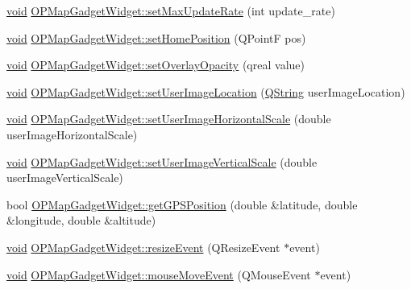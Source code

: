 \begin{DoxyCompactItemize}
\item 
\hyperlink{group___u_a_v_objects_plugin_ga444cf2ff3f0ecbe028adce838d373f5c}{void} \hyperlink{group___o_p_map_plugin_ga865f22d42c30a2446539f03df486e64e}{\-O\-P\-Map\-Gadget\-Widget\-::set\-Max\-Update\-Rate} (int update\-\_\-rate)
\item 
\hyperlink{group___u_a_v_objects_plugin_ga444cf2ff3f0ecbe028adce838d373f5c}{void} \hyperlink{group___o_p_map_plugin_ga44a752ab2b6f6b6212e39316b4050683}{\-O\-P\-Map\-Gadget\-Widget\-::set\-Home\-Position} (\-Q\-Point\-F pos)
\item 
\hyperlink{group___u_a_v_objects_plugin_ga444cf2ff3f0ecbe028adce838d373f5c}{void} \hyperlink{group___o_p_map_plugin_ga7d642e3ea7bf1e5cd0cc8be6dafc7ba8}{\-O\-P\-Map\-Gadget\-Widget\-::set\-Overlay\-Opacity} (qreal value)
\item 
\hyperlink{group___u_a_v_objects_plugin_ga444cf2ff3f0ecbe028adce838d373f5c}{void} \hyperlink{group___o_p_map_plugin_ga7afda7ed24be3606e25a6005fcc881da}{\-O\-P\-Map\-Gadget\-Widget\-::set\-User\-Image\-Location} (\hyperlink{group___u_a_v_objects_plugin_gab9d252f49c333c94a72f97ce3105a32d}{\-Q\-String} user\-Image\-Location)
\item 
\hyperlink{group___u_a_v_objects_plugin_ga444cf2ff3f0ecbe028adce838d373f5c}{void} \hyperlink{group___o_p_map_plugin_gab57277e52834ff73fe190391e3b2aa40}{\-O\-P\-Map\-Gadget\-Widget\-::set\-User\-Image\-Horizontal\-Scale} (double user\-Image\-Horizontal\-Scale)
\item 
\hyperlink{group___u_a_v_objects_plugin_ga444cf2ff3f0ecbe028adce838d373f5c}{void} \hyperlink{group___o_p_map_plugin_gab9a1ad0c6a406ed144ba3ec120d94d28}{\-O\-P\-Map\-Gadget\-Widget\-::set\-User\-Image\-Vertical\-Scale} (double user\-Image\-Vertical\-Scale)
\item 
bool \hyperlink{group___o_p_map_plugin_ga9d583efd0d407c4f509e812d454b41e0}{\-O\-P\-Map\-Gadget\-Widget\-::get\-G\-P\-S\-Position} (double \&latitude, double \&longitude, double \&altitude)
\item 
\hyperlink{group___u_a_v_objects_plugin_ga444cf2ff3f0ecbe028adce838d373f5c}{void} \hyperlink{group___o_p_map_plugin_ga5364db038789e0e4ad94ae0606391100}{\-O\-P\-Map\-Gadget\-Widget\-::resize\-Event} (\-Q\-Resize\-Event $\ast$event)
\item 
\hyperlink{group___u_a_v_objects_plugin_ga444cf2ff3f0ecbe028adce838d373f5c}{void} \hyperlink{group___o_p_map_plugin_gac0a4e19ec058721095f125dfba28ea79}{\-O\-P\-Map\-Gadget\-Widget\-::mouse\-Move\-Event} (\-Q\-Mouse\-Event $\ast$event)
\item 

\end{DoxyCompactItemize}

